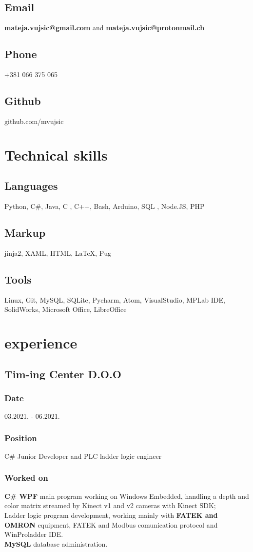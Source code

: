 \documentclass[10pt]{article}
\begin{document}
\subsection{Email}
\textbf{mateja.vujsic@gmail.com} and \textbf{mateja.vujsic@protonmail.ch}
\subsection{Phone}
+381 066 375 065
\subsection{Github}
github.com/mvujsic

\section{Technical skills}
\subsection{Languages}
Python, C\#, Java, C , C++, Bash, Arduino, SQL , Node.JS, PHP
\subsection{Markup}
 jinja2, XAML, HTML, \LaTeX, Pug
\subsection{Tools}
Linux, Git, MySQL, SQLite, Pycharm, Atom, VisualStudio, MPLab IDE, SolidWorks,  Microsoft Office,  LibreOffice

\section{experience}
\subsection{\large{Tim-ing Center D.O.O}}
\subsubsection{Date}
03.2021. - 06.2021.
\subsubsection{Position}
C\# Junior Developer and PLC ladder logic engineer
\subsubsection{Worked on}
\textbf{C\# WPF} main program working on Windows Embedded, handling a depth and color matrix streamed by Kinect v1 and v2 cameras with Kinect SDK;\\
Ladder logic program development, working mainly with \textbf{FATEK and OMRON} equipment, FATEK and Modbus comunication protocol and WinProladder IDE.\\
\textbf{MySQL} database administration.\\
\end{document}
